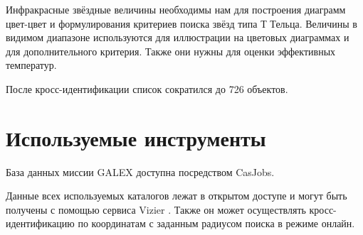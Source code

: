 Инфракрасные звёздные величины необходимы нам для построения диаграмм цвет-цвет и формулирования критериев поиска звёзд типа Т Тельца. Величины в видимом диапазоне используются для иллюстрации на цветовых диаграммах и для дополнительного критерия. Также они нужны для оценки эффективных температур.

После кросс-идентификации список сократился до 726 объектов. 

\section{Используемые инструменты}
База данных миссии GALEX доступна посредством CasJobs. 

Данные всех используемых каталогов лежат в открытом доступе и могут быть получены с помощью сервиса Vizier \cite{ochsenbein2000vizier}. Также он может осуществлять кросс-идентификацию по координатам с заданным радиусом поиска в режиме онлайн. 
